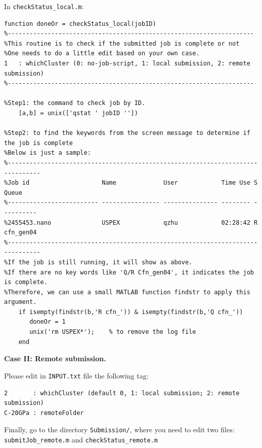 \documentclass[12pt]{article}
\newcommand{\file}[1]{\texttt{#1}}
\begin{document}
In \file{checkStatus\_local.m}:
\begin{lstlisting}
function doneOr = checkStatus_local(jobID)
%--------------------------------------------------------------------
%This routine is to check if the submitted job is complete or not
%One needs to do a little edit based on your own case.
1   : whichCluster (0: no-job-script, 1: local submission, 2: remote submission)
%--------------------------------------------------------------------

%Step1: the command to check job by ID. 
    [a,b] = unix(['qstat ' jobID ''])

%Step2: to find the keywords from the screen message to determine if the job is complete
%Below is just a sample:
%-------------------------------------------------------------------------------
%Job id                    Name             User            Time Use S Queue
%------------------------- ---------------- --------------- -------- - ---------
%2455453.nano              USPEX            qzhu            02:28:42 R cfn_gen04
%-------------------------------------------------------------------------------
%If the job is still running, it will show as above.
%If there are no key words like 'Q/R Cfn_gen04', it indicates the job is complete.
%Therefore, we can use a small MATLAB function findstr to apply this argument.
    if isempty(findstr(b,'R cfn_')) & isempty(findstr(b,'Q cfn_'))   
       doneOr = 1
       unix('rm USPEX*');    % to remove the log file
	end
\end{lstlisting}

\textbf{Case II: Remote submission.}

Please edit in \file{INPUT.txt} file the following tag:

{\footnotesize
\begin{verbatim}
2       : whichCluster (default 0, 1: local submission; 2: remote submission)
C-20GPa : remoteFolder
\end{verbatim}
}

Finally, go to the directory \file{Submission/}, where you need to edit two
files: \\
\file{submitJob\_remote.m} and \file{checkStatus\_remote.m}
\end{document}
